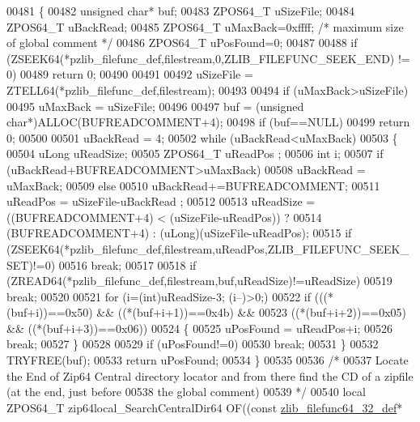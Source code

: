 \begin{DoxyCode}
00481 \{
00482   \textcolor{keywordtype}{unsigned} \textcolor{keywordtype}{char}* buf;
00483   ZPOS64\_T uSizeFile;
00484   ZPOS64\_T uBackRead;
00485   ZPOS64\_T uMaxBack=0xffff; \textcolor{comment}{/* maximum size of global comment */}
00486   ZPOS64\_T uPosFound=0;
00487 
00488   \textcolor{keywordflow}{if} (ZSEEK64(*pzlib\_filefunc\_def,filestream,0,ZLIB\_FILEFUNC\_SEEK\_END) != 0)
00489     \textcolor{keywordflow}{return} 0;
00490 
00491 
00492   uSizeFile = ZTELL64(*pzlib\_filefunc\_def,filestream);
00493 
00494   \textcolor{keywordflow}{if} (uMaxBack>uSizeFile)
00495     uMaxBack = uSizeFile;
00496 
00497   buf = (\textcolor{keywordtype}{unsigned} \textcolor{keywordtype}{char}*)ALLOC(BUFREADCOMMENT+4);
00498   \textcolor{keywordflow}{if} (buf==NULL)
00499     \textcolor{keywordflow}{return} 0;
00500 
00501   uBackRead = 4;
00502   \textcolor{keywordflow}{while} (uBackRead<uMaxBack)
00503   \{
00504     uLong uReadSize;
00505     ZPOS64\_T uReadPos ;
00506     \textcolor{keywordtype}{int} i;
00507     \textcolor{keywordflow}{if} (uBackRead+BUFREADCOMMENT>uMaxBack)
00508       uBackRead = uMaxBack;
00509     \textcolor{keywordflow}{else}
00510       uBackRead+=BUFREADCOMMENT;
00511     uReadPos = uSizeFile-uBackRead ;
00512 
00513     uReadSize = ((BUFREADCOMMENT+4) < (uSizeFile-uReadPos)) ?
00514       (BUFREADCOMMENT+4) : (uLong)(uSizeFile-uReadPos);
00515     \textcolor{keywordflow}{if} (ZSEEK64(*pzlib\_filefunc\_def,filestream,uReadPos,ZLIB\_FILEFUNC\_SEEK\_SET)!=0)
00516       \textcolor{keywordflow}{break};
00517 
00518     \textcolor{keywordflow}{if} (ZREAD64(*pzlib\_filefunc\_def,filestream,buf,uReadSize)!=uReadSize)
00519       \textcolor{keywordflow}{break};
00520 
00521     \textcolor{keywordflow}{for} (i=(\textcolor{keywordtype}{int})uReadSize-3; (i--)>0;)
00522       \textcolor{keywordflow}{if} (((*(buf+i))==0x50) && ((*(buf+i+1))==0x4b) &&
00523         ((*(buf+i+2))==0x05) && ((*(buf+i+3))==0x06))
00524       \{
00525         uPosFound = uReadPos+i;
00526         \textcolor{keywordflow}{break};
00527       \}
00528 
00529       \textcolor{keywordflow}{if} (uPosFound!=0)
00530         \textcolor{keywordflow}{break};
00531   \}
00532   TRYFREE(buf);
00533   \textcolor{keywordflow}{return} uPosFound;
00534 \}
00535 
00536 \textcolor{comment}{/*}
00537 \textcolor{comment}{Locate the End of Zip64 Central directory locator and from there find the CD of a zipfile (at the end, just
       before}
00538 \textcolor{comment}{the global comment)}
00539 \textcolor{comment}{*/}
00540 local ZPOS64\_T zip64local\_SearchCentralDir64 OF((\textcolor{keyword}{const} \hyperlink{structzlib__filefunc64__32__def__s}{zlib\_filefunc64\_32\_def}* 

\end{DoxyCode}
